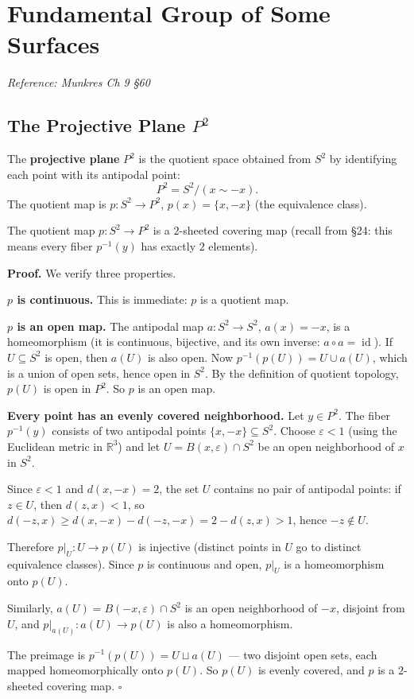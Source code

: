 \documentclass[11pt]{report}
\renewenvironment{proof}[1][Proof]{\noindent\textbf{#1.} }{\hfill$\square$\par\vspace{5pt}}
\begin{document}
\section{Fundamental Group of Some Surfaces}

\textit{Reference: Munkres Ch 9 \S 60}

\subsection{The Projective Plane $P^2$}

\begin{defbox}
The \textbf{projective plane} $P^2$ is the quotient space obtained from $S^2$ by identifying each point with its antipodal point:
\[P^2 = S^2 / (x \sim -x).\]
The quotient map is $p: S^2 \to P^2$, $p(x) = \{x, -x\}$ (the equivalence class).
\end{defbox}

\begin{thmbox}
The quotient map $p: S^2 \to P^2$ is a $2$-sheeted covering map (recall from \S 24: this means every fiber $p^{-1}(y)$ has exactly $2$ elements).
\end{thmbox}

\begin{proof}
We verify three properties.

\textbf{$p$ is continuous.} This is immediate: $p$ is a quotient map.

\textbf{$p$ is an open map.} The antipodal map $a: S^2 \to S^2$, $a(x) = -x$, is a homeomorphism (it is continuous, bijective, and its own inverse: $a \circ a = \operatorname{id}$). If $U \subseteq S^2$ is open, then $a(U)$ is also open. Now $p^{-1}(p(U)) = U \cup a(U)$, which is a union of open sets, hence open in $S^2$. By the definition of quotient topology, $p(U)$ is open in $P^2$. So $p$ is an open map.

\textbf{Every point has an evenly covered neighborhood.} Let $y \in P^2$. The fiber $p^{-1}(y)$ consists of two antipodal points $\{x, -x\} \subseteq S^2$. Choose $\varepsilon < 1$ (using the Euclidean metric in $\mathbb{R}^3$) and let $U = B(x, \varepsilon) \cap S^2$ be an open neighborhood of $x$ in $S^2$.

Since $\varepsilon < 1$ and $d(x, -x) = 2$, the set $U$ contains no pair of antipodal points: if $z \in U$, then $d(z, x) < 1$, so $d(-z, x) \geq d(x, -x) - d(-z, -x) = 2 - d(z, x) > 1$, hence $-z \notin U$.

Therefore $p|_U: U \to p(U)$ is injective (distinct points in $U$ go to distinct equivalence classes). Since $p$ is continuous and open, $p|_U$ is a homeomorphism onto $p(U)$.

Similarly, $a(U) = B(-x, \varepsilon) \cap S^2$ is an open neighborhood of $-x$, disjoint from $U$, and $p|_{a(U)}: a(U) \to p(U)$ is also a homeomorphism.

The preimage is $p^{-1}(p(U)) = U \sqcup a(U)$ --- two disjoint open sets, each mapped homeomorphically onto $p(U)$. So $p(U)$ is evenly covered, and $p$ is a $2$-sheeted covering map.
\end{proof}
\end{document}
